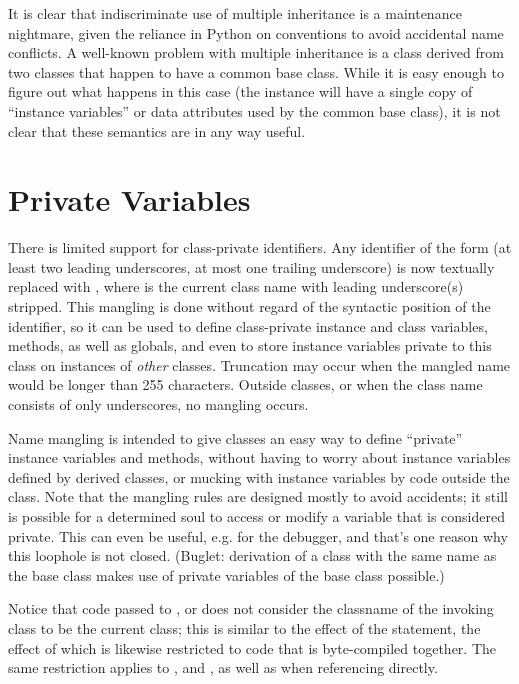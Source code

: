 \documentclass{manual}
\begin{document}
It is clear that indiscriminate use of multiple inheritance is a
maintenance nightmare, given the reliance in Python on conventions to
avoid accidental name conflicts.  A well-known problem with multiple
inheritance is a class derived from two classes that happen to have a
common base class.  While it is easy enough to figure out what happens
in this case (the instance will have a single copy of ``instance
variables'' or data attributes used by the common base class), it is
not clear that these semantics are in any way useful.


\section{Private Variables \label{private}}

There is limited support for class-private
identifiers.  Any identifier of the form  (at least two
leading underscores, at most one trailing underscore) is now textually
replaced with , where  is the
current class name with leading underscore(s) stripped.  This mangling
is done without regard of the syntactic position of the identifier, so
it can be used to define class-private instance and class variables,
methods, as well as globals, and even to store instance variables
private to this class on instances of \emph{other} classes.  Truncation
may occur when the mangled name would be longer than 255 characters.
Outside classes, or when the class name consists of only underscores,
no mangling occurs.

Name mangling is intended to give classes an easy way to define
``private'' instance variables and methods, without having to worry
about instance variables defined by derived classes, or mucking with
instance variables by code outside the class.  Note that the mangling
rules are designed mostly to avoid accidents; it still is possible for
a determined soul to access or modify a variable that is considered
private.  This can even be useful, e.g. for the debugger, and that's
one reason why this loophole is not closed.  (Buglet: derivation of a
class with the same name as the base class makes use of private
variables of the base class possible.)

Notice that code passed to ,  or
 does not consider the classname of the invoking 
class to be the current class; this is similar to the effect of the 
 statement, the effect of which is likewise restricted to 
code that is byte-compiled together.  The same restriction applies to
,  and , as well as
when referencing  directly.
\end{document}
